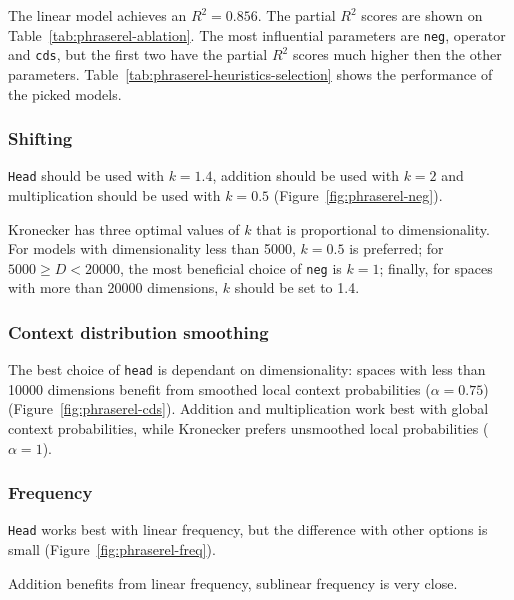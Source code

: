 


The linear model achieves an $R^2 = 0.856$. The partial $R^2$ scores are shown on Table~\ref{tab:phraserel-ablation}. The most influential parameters are \texttt{neg}, operator and \texttt{cds}, but the first two have the partial $R^2$ scores much higher then the other parameters. Table~\ref{tab:phraserel-heuristics-selection} shows the performance of the picked models.

\subsubsection{Shifting}
\label{sec:shifting-phraserel}

\texttt{Head} should be used with $k = 1.4$, addition should be used with $k = 2$ and multiplication should be used with $k = 0.5$ (Figure~\ref{fig:phraserel-neg}).

Kronecker has three optimal values of $k$ that is proportional to dimensionality. For models with dimensionality less than 5000, $k = 0.5$ is preferred; for $5000 \geq D < 20000$, the most beneficial choice of \texttt{neg} is $k = 1$; finally, for spaces with more than 20000 dimensions, $k$ should be set to 1.4.

\subsubsection{Context distribution smoothing}
\label{sec:cont-distr-smooth-phraserel}

The best choice of \texttt{head} is dependant on dimensionality: spaces with less than 10000 dimensions benefit from smoothed local context probabilities ($\alpha = 0.75$) (Figure~\ref{fig:phraserel-cds}). Addition and multiplication work best with global context probabilities, while Kronecker prefers unsmoothed local probabilities ($\alpha = 1$).

\subsubsection{Frequency}
\label{sec:frequency-phraserel}



\texttt{Head} works best with linear frequency, but the difference with other options is small (Figure~\ref{fig:phraserel-freq}).

Addition benefits from linear frequency, sublinear frequency is very close.

